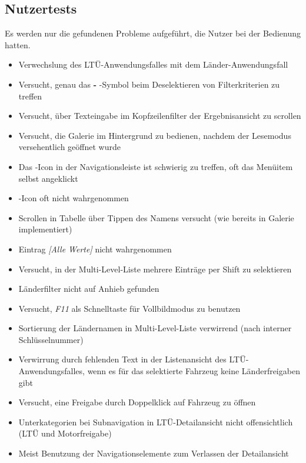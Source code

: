 \subsection{Nutzertests}
Es werden nur die gefundenen Probleme aufgeführt, die Nutzer bei der Bedienung hatten.
\begin{itemize}
 \item Verwechslung des LTÜ-Anwendungsfalles mit dem Länder-Anwendungsfall
 \item Versucht, genau das \textbf{-} -Symbol beim Deselektieren von Filterkriterien zu treffen
 \item Versucht, über Texteingabe im Kopfzeilenfilter der Ergebnisansicht zu scrollen
\end{itemize}
\begin{itemize}
 \item Versucht, die Galerie im Hintergrund zu bedienen, nachdem der Lesemodus versehentlich geöffnet wurde
 \item Das -Icon in der Navigationsleiste ist schwierig zu treffen, oft das Menüitem selbst angeklickt
 \item {}-Icon oft nicht wahrgenommen
 \item Scrollen in Tabelle über Tippen des Namens versucht (wie bereits in Galerie implementiert)
\end{itemize}
\begin{itemize}
 \item Eintrag \textit{[Alle Werte]} nicht wahrgenommen
 \item Versucht, in der Multi-Level-Liste mehrere Einträge per Shift zu selektieren
\end{itemize}
\begin{itemize}
 \item Länderfilter nicht auf Anhieb gefunden
 \item Versucht, \textit{F11} als Schnelltaste für Vollbildmodus zu benutzen
 \item Sortierung der Ländernamen in Multi-Level-Liste verwirrend (nach interner Schlüsselnummer)
 \item Verwirrung durch fehlenden Text in der Listenansicht des LTÜ-Anwendungsfalles, wenn es für das selektierte Fahrzeug keine Länderfreigaben gibt
 \item Versucht, eine Freigabe durch Doppelklick auf Fahrzeug zu öffnen
 \item Unterkategorien bei Subnavigation in LTÜ-Detailansicht nicht offensichtlich (LTÜ und Motorfreigabe)
 \item Meist Benutzung der Navigationselemente zum Verlassen der Detailansicht
\end{itemize}
